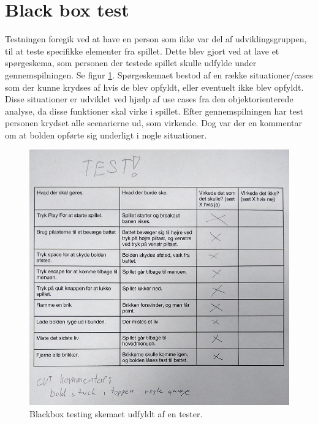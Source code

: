 
\section{Black box test}
Testningen foregik ved at have en person som ikke var del af udviklingsgruppen, til at teste specifikke elementer fra spillet. Dette blev gjort ved at lave et spørgeskema, som personen der testede spillet skulle udfylde under gennemspilningen. Se figur \ref{dia:blackbox1}. Spørgeskemaet bestod af en række situationer/cases som der kunne krydses af hvis de blev opfyldt, eller eventuelt ikke blev opfyldt. Disse situationer er udviklet ved hjælp af use cases fra den objektorienterede analyse, da disse funktioner skal virke i spillet. Efter gennemspilningen har test personen krydset alle scenarierne ud, som virkende. Dog var der en kommentar om at bolden opførte sig underligt i nogle situationer.

\begin{figure}
	\begin{center}
		\caption{Blackbox testing skemaet udfyldt af en tester.}
		\label{dia:blackbox1}
		\includegraphics[width=0.98\linewidth]{pictures/testing/BlackboxTestArkBilag}
		\end{center}
\end{figure}